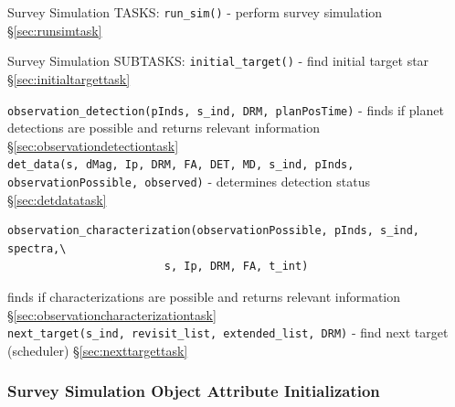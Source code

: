 \documentclass[cleanfoot]{asme2ej}
\begin{document}
Survey Simulation TASKS: 
\verb+run_sim()+ - perform survey simulation \S\ref{sec:runsimtask}

Survey Simulation SUBTASKS:
\verb+initial_target()+ - find initial target star \S\ref{sec:initialtargettask}

\verb+observation_detection(pInds, s_ind, DRM, planPosTime)+ - finds if planet detections are possible and returns relevant information \S\ref{sec:observationdetectiontask}\\
\verb+det_data(s, dMag, Ip, DRM, FA, DET, MD, s_ind, pInds, observationPossible, observed)+ - determines detection status \S\ref{sec:detdatatask}
\begin{verbatim}
observation_characterization(observationPossible, pInds, s_ind, spectra,\
	 					s, Ip, DRM, FA, t_int)
\end{verbatim} 
finds if characterizations are possible and returns relevant information \S\ref{sec:observationcharacterizationtask}\\
\verb+next_target(s_ind, revisit_list, extended_list, DRM)+ - find next target (scheduler) \S\ref{sec:nexttargettask}

\subsubsection{Survey Simulation Object Attribute Initialization}
\end{document}
